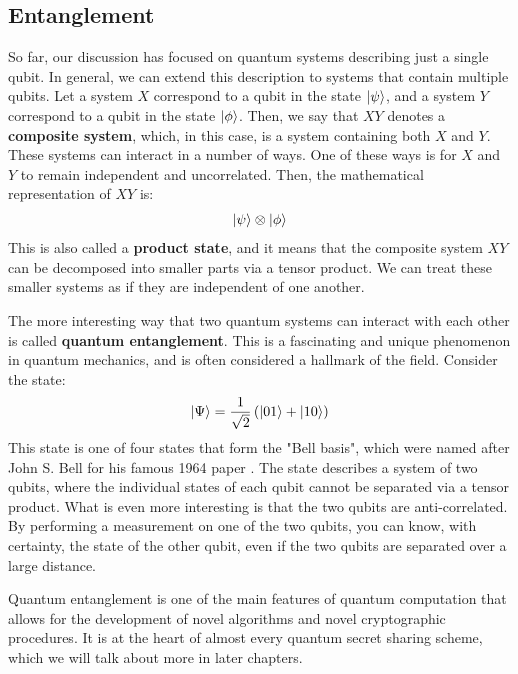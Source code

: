 \subsection{Entanglement}
\label{ssec:entanglement}

So far, our discussion has focused on quantum systems describing just a single qubit. In general, we can extend this description to systems that contain multiple qubits. Let a system $X$ correspond to a qubit in the state $\ket{\psi}$, and a system $Y$ correspond to a qubit in the state $\ket{\phi}$. Then, we say that $XY$ denotes a \textbf{composite system}, which, in this case, is a system containing both $X$ and $Y$. These systems can interact in a number of ways. One of these ways is for $X$ and $Y$ to remain independent and uncorrelated. Then, the mathematical representation of $XY$ is:
\begin{align}
    \ket{\psi} \otimes \ket{\phi}
\end{align}
This is also called a \textbf{product state}, and it means that the composite system $XY$ can be decomposed into smaller parts via a tensor product. We can treat these smaller systems as if they are independent of one another.

The more interesting way that two quantum systems can interact with each other is called \textbf{quantum entanglement}. This is a fascinating and unique phenomenon in quantum mechanics, and is often considered a hallmark of the field. Consider the state:
\begin{align*}
    \ket{\Psi} &= \frac{1}{\sqrt{2}}\left( \ket{01} + \ket{10} \right) \\ 
\end{align*}
This state is one of four states that form the "Bell basis", which were named after John S. Bell for his famous 1964 paper \cite{bell1964einstein}. The state describes a system of two qubits, where the individual states of each qubit cannot be separated via a tensor product. What is even more interesting is that the two qubits are anti-correlated. By performing a measurement on one of the two qubits, you can know, with certainty, the state of the other qubit, even if the two qubits are separated over a large distance.

Quantum entanglement is one of the main features of quantum computation that allows for the development of novel algorithms and novel cryptographic procedures. It is at the heart of almost every quantum secret sharing scheme, which we will talk about more in later chapters.

